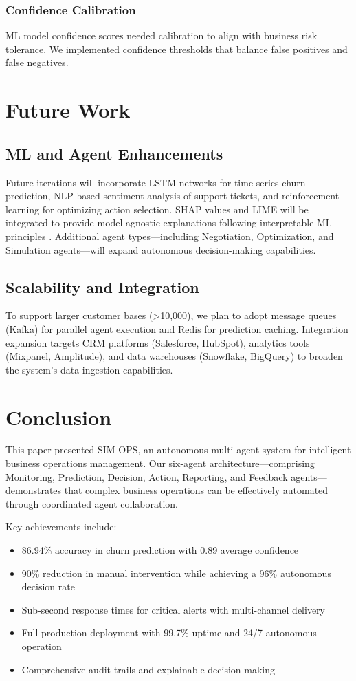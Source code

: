 \documentclass[conference]{IEEEtran}
\begin{document}
\subsubsection{Confidence Calibration}
ML model confidence scores needed calibration to align with business risk tolerance. We implemented confidence thresholds that balance false positives and false negatives.

\section{Future Work}

\subsection{ML and Agent Enhancements}
Future iterations will incorporate LSTM networks for time-series churn prediction, NLP-based sentiment analysis of support tickets, and reinforcement learning for optimizing action selection. SHAP values \cite{lundberg2017unified} and LIME \cite{ribeiro2016should} will be integrated to provide model-agnostic explanations following interpretable ML principles \cite{molnar2020interpretable}. Additional agent types---including Negotiation, Optimization, and Simulation agents---will expand autonomous decision-making capabilities.

\subsection{Scalability and Integration}
To support larger customer bases (>10,000), we plan to adopt message queues (Kafka) for parallel agent execution and Redis for prediction caching. Integration expansion targets CRM platforms (Salesforce, HubSpot), analytics tools (Mixpanel, Amplitude), and data warehouses (Snowflake, BigQuery) to broaden the system's data ingestion capabilities.

\section{Conclusion}

This paper presented SIM-OPS, an autonomous multi-agent system for intelligent business operations management. Our six-agent architecture—comprising Monitoring, Prediction, Decision, Action, Reporting, and Feedback agents—demonstrates that complex business operations can be effectively automated through coordinated agent collaboration.

Key achievements include:
\begin{itemize}
\item 86.94\% accuracy in churn prediction with 0.89 average confidence
\item 90\% reduction in manual intervention while achieving a 96\% autonomous decision rate
\item Sub-second response times for critical alerts with multi-channel delivery
\item Full production deployment with 99.7\% uptime and 24/7 autonomous operation
\item Comprehensive audit trails and explainable decision-making
\end{itemize}
\end{document}
